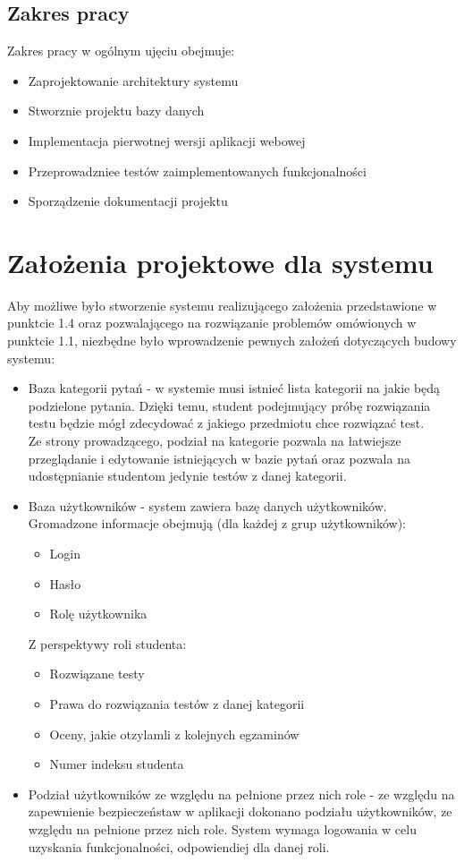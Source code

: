 \documentclass[a4paper, titlepage]{article}
\begin{document}
\subsection{Zakres pracy}
Zakres pracy w ogólnym ujęciu obejmuje:
\begin{itemize}
\item Zaprojektowanie architektury systemu
\item Stworznie projektu bazy danych
\item Implementacja pierwotnej wersji aplikacji webowej
\item Przeprowadzniee testów zaimplementowanych funkcjonalności
\item Sporządzenie dokumentacji projektu
\end{itemize}

\section{Założenia projektowe dla systemu}
Aby możliwe było stworzenie systemu realizującego założenia przedstawione w punktcie 1.4 oraz pozwalającego na rozwiązanie problemów omówionych w punktcie 1.1, niezbędne było wprowadzenie pewnych założeń dotyczących budowy systemu:
\begin{itemize}
\item Baza kategorii pytań - w systemie musi istnieć lista kategorii na jakie będą podzielone pytania. Dzięki temu, student podejmujący próbę rozwiązania testu będzie mógł zdecydować z jakiego przedmiotu chce rozwiązać test.
\\Ze strony prowadzącego, podział na kategorie pozwala na łatwiejsze przeglądanie i edytowanie istniejących w bazie pytań oraz pozwala na udostępnianie studentom jedynie testów z danej kategorii.
\item Baza użytkowników - system zawiera bazę danych użytkowników. Gromadzone informacje obejmują (dla każdej z grup użytkowników):
	\begin {itemize}
    	\item Login
        \item Hasło
        \item Rolę użytkownika
    \end{itemize}
Z perspektywy roli studenta:    
    \begin {itemize}
    \item Rozwiązane testy
    \item Prawa do rozwiązania testów z danej kategorii
    \item Oceny, jakie otzylamli z kolejnych egzaminów
    \item Numer indeksu studenta
    \end{itemize}
\item Podział użytkowników ze względu na pełnione przez nich role - ze względu na zapewnienie bezpieczeństaw w aplikacji dokonano podziału użytkowników, ze względu na pełnione przez nich role. System wymaga logowania w celu uzyskania funkcjonalności, odpowiendiej dla danej roli.
\end{itemize}
\end{document}
